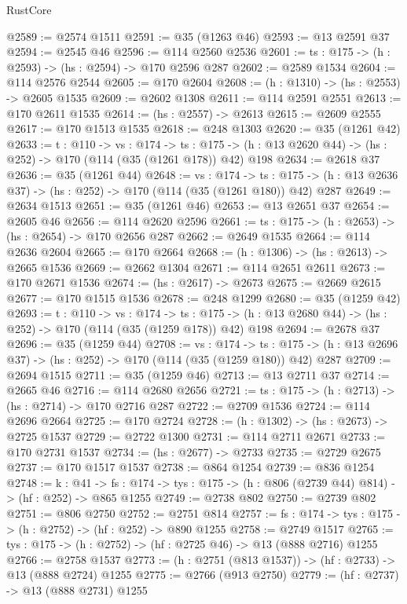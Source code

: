 \begin{lexlean}{RustCore}
\begin{coremodule}
@2589 := @2574 @1511
@2591 := @35 (@1263 @46)
@2593 := @13 @2591 @37
@2594 := @2545 @46
@2596 := @114 @2560 @2536
@2601 := {ts : @175} -> (h : @2593) -> (hs : @2594) -> @170 @2596 @287
@2602 := @2589 @1534
@2604 := @114 @2576 @2544
@2605 := @170 @2604
@2608 := (h : @1310) -> (hs : @2553) -> @2605 @1535
@2609 := @2602 @1308
@2611 := @114 @2591 @2551
@2613 := @170 @2611 @1535
@2614 := (hs : @2557) -> @2613
@2615 := @2609 @2555
@2617 := @170 @1513 @1535
@2618 := @248 @1303
@2620 := @35 (@1261 @42)
@2633 := {t : @110} ->
  {vs : @174} ->
  {ts : @175} -> (h : @13 @2620 @44) -> (hs : @252) -> @170 (@114 (@35 (@1261 @178)) @42) @198
@2634 := @2618 @37
@2636 := @35 (@1261 @44)
@2648 := {vs : @174} ->
  {ts : @175} -> (h : @13 @2636 @37) -> (hs : @252) -> @170 (@114 (@35 (@1261 @180)) @42) @287
@2649 := @2634 @1513
@2651 := @35 (@1261 @46)
@2653 := @13 @2651 @37
@2654 := @2605 @46
@2656 := @114 @2620 @2596
@2661 := {ts : @175} -> (h : @2653) -> (hs : @2654) -> @170 @2656 @287
@2662 := @2649 @1535
@2664 := @114 @2636 @2604
@2665 := @170 @2664
@2668 := (h : @1306) -> (hs : @2613) -> @2665 @1536
@2669 := @2662 @1304
@2671 := @114 @2651 @2611
@2673 := @170 @2671 @1536
@2674 := (hs : @2617) -> @2673
@2675 := @2669 @2615
@2677 := @170 @1515 @1536
@2678 := @248 @1299
@2680 := @35 (@1259 @42)
@2693 := {t : @110} ->
  {vs : @174} ->
  {ts : @175} -> (h : @13 @2680 @44) -> (hs : @252) -> @170 (@114 (@35 (@1259 @178)) @42) @198
@2694 := @2678 @37
@2696 := @35 (@1259 @44)
@2708 := {vs : @174} ->
  {ts : @175} -> (h : @13 @2696 @37) -> (hs : @252) -> @170 (@114 (@35 (@1259 @180)) @42) @287
@2709 := @2694 @1515
@2711 := @35 (@1259 @46)
@2713 := @13 @2711 @37
@2714 := @2665 @46
@2716 := @114 @2680 @2656
@2721 := {ts : @175} -> (h : @2713) -> (hs : @2714) -> @170 @2716 @287
@2722 := @2709 @1536
@2724 := @114 @2696 @2664
@2725 := @170 @2724
@2728 := (h : @1302) -> (hs : @2673) -> @2725 @1537
@2729 := @2722 @1300
@2731 := @114 @2711 @2671
@2733 := @170 @2731 @1537
@2734 := (hs : @2677) -> @2733
@2735 := @2729 @2675
@2737 := @170 @1517 @1537
@2738 := @864 @1254
@2739 := @836 @1254
@2748 := {k : @41} ->
  {fs : @174} -> {tys : @175} -> (h : @806 (@2739 @44) @814) -> (hf : @252) -> @865 @1255
@2749 := @2738 @802
@2750 := @2739 @802
@2751 := @806 @2750
@2752 := @2751 @814
@2757 := {fs : @174} -> {tys : @175} -> (h : @2752) -> (hf : @252) -> @890 @1255
@2758 := @2749 @1517
@2765 := {tys : @175} -> (h : @2752) -> (hf : @2725 @46) -> @13 (@888 @2716) @1255
@2766 := @2758 @1537
@2773 := (h : @2751 (@813 @1537)) -> (hf : @2733) -> @13 (@888 @2724) @1255
@2775 := @2766 (@913 @2750)
@2779 := (hf : @2737) -> @13 (@888 @2731) @1255

\end{coremodule}
\end{lexlean}
